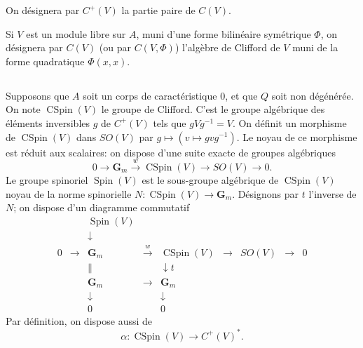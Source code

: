 \documentclass[11pt]{amsart}
\theoremstyle{plain}
\theoremstyle{definition}
\theoremstyle{remark}
\begin{document}
On d\'esignera par $C^+(V)$ la partie paire de $C(V)$.

Si $V$ est un module libre sur $A$, muni d'une forme bilin\'eaire sym\'etrique $\Phi$, on d\'esignera par $C(V)$ (ou par $C(V,\Phi)$) l'alg\`ebre de Clifford de $V$ muni de la forme quadratique $\Phi(x,x)$.

\subsection*{}
Supposons que $A$ soit un corps de caract\'eristique $0$, et que $Q$ soit non d\'eg\'en\'er\'ee. On note $\operatorname{CSpin}(V)$ le groupe de Clifford. C'est le groupe alg\'ebrique des \'el\'ements inversibles $g$ de $C^+(V)$ tels que $gVg^{-1}=V$. On d\'efinit un morphisme de $\operatorname{CSpin}(V)$ dans $SO(V)$ par $g\mapsto(v\mapsto gvg^{-1})$. Le noyau de ce morphisme est r\'eduit aux scalaires: on dispose d'une suite exacte de groupes alg\'ebriques
\begin{equation*}
0\to\mathbf{G}_m\xrightarrow{w}\operatorname{CSpin}(V)\to SO(V)\to 0.
\end{equation*}
Le groupe spinoriel $\operatorname{Spin}(V)$ est le sous-groupe alg\'ebrique de $\operatorname{CSpin}(V)$ noyau de la norme spinorielle $N\colon\operatorname{CSpin}(V)\to\mathbf{G}_m$. D\'esignons par $t$ l'inverse de $N$; on dispose d'un diagramme commutatif
\begin{equation}\label{eq:3.2.1}
\begin{array}{ccccccccc}
& & \operatorname{Spin}(V) & & & & & & \\
& & \downarrow & & & & & & \\
0 & \to & \mathbf{G}_m & \xrightarrow{w} & \operatorname{CSpin}(V) & \to & SO(V) & \to & 0 \\
& & \| & & \downarrow{t} & & & & \\
& & \mathbf{G}_m & \xrightarrow{\hspace{1em}} & \mathbf{G}_m & & & & \\
& & \downarrow & & \downarrow & & & & \\
& & 0 & & 0 & & & &
\end{array}
\end{equation}
Par d\'efinition, on dispose aussi de
\begin{equation}\label{eq:3.2.2}
\alpha\colon\operatorname{CSpin}(V)\longrightarrow C^+(V)^*.
\end{equation}
\end{document}
